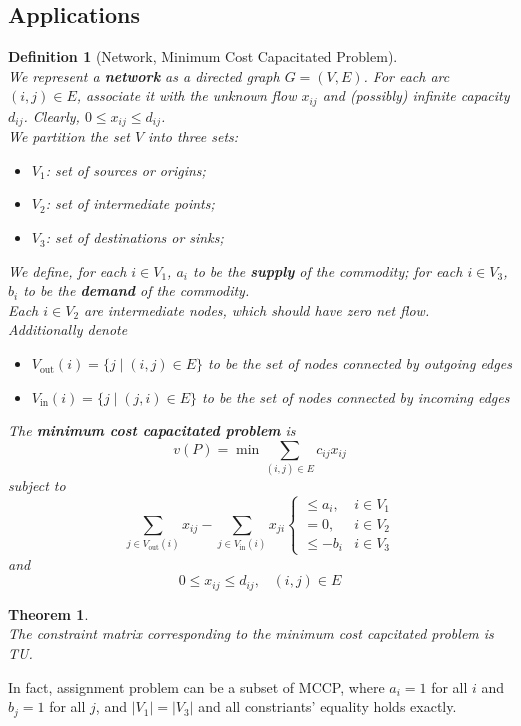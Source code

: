 \documentclass[12pt]{article}
\newtheorem{definition}{Definition}[section]
\newtheorem{theorem}{Theorem}[section]
\theoremstyle{definition}
\begin{document}
\subsection{Applications}
\begin{definition}[Network, Minimum Cost Capacitated Problem]
\hfill\\\normalfont We represent a \textbf{network} as a directed graph $G=(V,E)$. For each arc $(i,j)\in E$, associate it with the unknown flow $x_{ij}$ and (possibly) infinite capacity $d_{ij}$. Clearly, $0\leq x_{ij}\leq d_{ij}$.\\
We partition the set $V$ into three sets:
\begin{itemize}
  \item $V_1$: set of sources or origins;
  \item $V_2$: set of intermediate points;
  \item $V_3$: set of destinations or sinks;
\end{itemize}
We define, for each $i\in V_1$, $a_i$ to be the \textbf{supply} of the commodity; for each $i\in V_3$, $b_i$ to be the \textbf{demand} of the commodity.\\
Each $i\in V_2$ are intermediate nodes, which should have zero net flow.\\

Additionally denote
\begin{itemize}
  \item $V_\text{out}(i) = \{j\mid (i,j)\in E\}$ to be the set of nodes connected by outgoing edges
  \item $V_\text{in}(i) = \{j\mid (j,i)\in E\}$ to be the set of nodes connected by incoming edges
\end{itemize}

The \textbf{minimum cost capacitated problem} is
\[
v(P) = \min \sum_{(i,j)\in E}c_{ij}x_{ij}
\]
subject to
\[
\sum_{j\in V_\text{out}(i)} x_{ij} - \sum_{j\in V_\text{in}(i)} x_{ji}\begin{cases}
\leq a_i,&i\in V_1\\
=0, &i\in V_2\\
\leq -b_i &i\in V_3
\end{cases}
\]
and
\[
0\leq x_{ij}\leq d_{ij}, \;\;\; (i,j)\in E
\]
\end{definition}
\begin{theorem}
\hfill\\\normalfont The constraint matrix corresponding to the minimum cost capcitated problem is TU.
\end{theorem}
In fact, assignment problem can be a subset of MCCP, where $a_i=1$ for all $i$ and $b_j=1$ for all $j$, and $|V_1|=|V_3|$ and all constriants' equality holds exactly.\\
\end{document}
